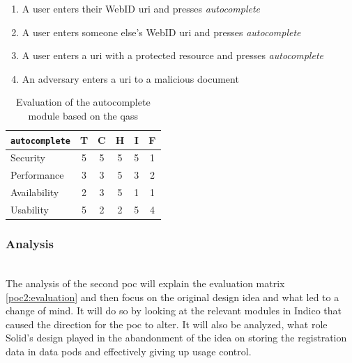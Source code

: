 \begin{enumerate}
    \item A user enters their WebID \gls{uri} and presses \textit{autocomplete}
    \item A user enters someone else's WebID \gls{uri} and presses \textit{autocomplete}
    \item A user enters a \gls{uri} with a protected resource and presses \textit{autocomplete}
    \item An adversary enters a \gls{uri} to a malicious document
\end{enumerate}

\begin{table}[h!]
    \centering
    \begin{tabular}{| l | c | c | c | c | c |} 
     \hline
     \texttt{autocomplete} & T & C & H & I & F \\
     \hline
     Security & 5 & 5 & 5 & 5 & \cellcolor{green!25}1\\
     \hline
     Performance & 3 & 3 & 5 & 3 & \cellcolor{green!25}2\\
     \hline
     Availability & 2 & 3 & 5 & 1 & \cellcolor{green!25}1\\
     \hline
     Usability & 5 & 2 & 2 & 5 & \cellcolor{red!25}4\\
     \hline
    \end{tabular}
    \vspace{0.75cm}
    \caption{Evaluation of the autocomplete module based on the \glspl{qas}}
    \label{table:poc2-evaluation}
\end{table}
\vspace{0.5cm}
\subsubsection{Analysis}\label{poc2:analysis}\mbox{}\\

The analysis of the second \gls{poc} will explain the evaluation matrix \ref{poc2:evaluation} and then focus on the original design idea and what led to a change of mind. It will do so by looking at the relevant modules in Indico that caused the direction for the \gls{poc} to alter. It will also be analyzed, what role Solid's design played in the abandonment of the idea on storing the registration data in data pods and effectively giving up usage control.

\vspace{0.5cm}


